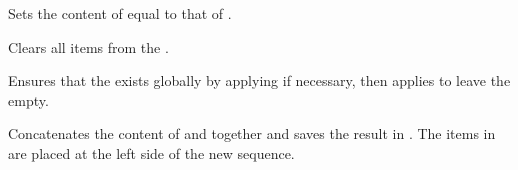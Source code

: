 \documentclass[oneside]{book}
\begin{document}
\begin{function}{\seqSetEq}
\begin{syntax}
  
\end{syntax}
Sets the content of  equal to that of
.
\begin{demohigh}
\seqSetFromClist {}
\seqSetEq \lTmpbSeq \lTmpaSeq
\seqVarJoin {}
\end{demohigh}
\end{function}

\begin{function}{\seqClear}
\begin{syntax}
 
\end{syntax}
Clears all items from the .
\begin{codehigh}
\seqClear \lTmpaSeq
\end{codehigh}
\end{function}

\begin{function}{\seqClearNew}
\begin{syntax}
 
\end{syntax}
Ensures that the  exists globally by applying
 if necessary, then applies  to leave
the  empty.
\begin{demohigh}
\seqClearNew \lFooSomeSeq
\seqSetFromClist {}
\seqVarJoin {}
\end{demohigh}
\end{function}

\begin{function}{\seqConcat}
\begin{syntax}
   
\end{syntax}
Concatenates the content of  and 
together and saves the result in . The items in
 are placed at the left side of the new sequence.
\begin{demohigh}
\seqSetFromClist {}
\seqSetFromClist {}
\seqConcat \lTmpaSeq \lTmpbSeq \lTmpcSeq
\seqVarJoin \lTmpaSeq {, }
\end{demohigh}
\end{function}
\end{document}
